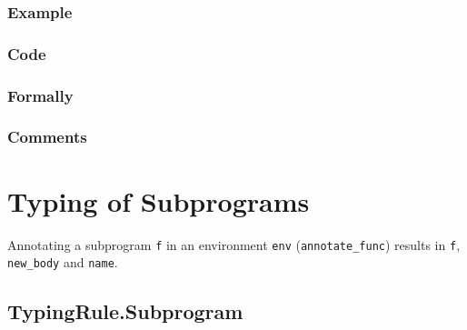 \documentclass{book}
\begin{document}
  \subsection{Example}

  \subsection{Code}

  \subsection{Formally}

  \subsection{Comments}

\chapter{Typing of Subprograms}

Annotating a subprogram \texttt{f} in an environment \texttt{env}
(\texttt{annotate\_func}) results in \texttt{f}, \texttt{new\_body} and
\texttt{name}.

\section{TypingRule.Subprogram \label{sec:TypingRule.Subprogram}}
\end{document}
